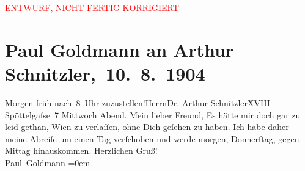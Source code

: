 
\begin{center}
            \textcolor{red}{ENTWURF, NICHT FERTIG KORRIGIERT}
                      \end{center}
            
         
         \renewcommand{\erwaehntePersonen}{Personen: Paul Goldmann}
         \renewcommand{\erwaehnteOrte}{Orte: Edmund-Weiß-Gasse 7, Wien}
         \renewcommand{\erwaehnteWerke}{}
               \section[ Paul Goldmann an Arthur Schnitzler, 10. 8. 1904]{ Paul Goldmann an Arthur Schnitzler, 10. 8. 1904}\nopagebreak{}\rehead{ }\begin{ledgroupsized}[t]{13cm}\normalsize\beginnumbering{} \toendnotes[C]{\smallbreak\pagebreak[2]} 
\toendnotes[C]{\smallbreak}\pstart{}{\pb}Morgen{ }früh nach 8 Uhr zuzustellen!\pend{}\pstart{}Herrn\pend{}\pstart{}Dr. Arthur Schnitzler\pend{}\pstart{}XVIII Spöttelgaſse 7\pend{}{\bigskip}\pstart
           {\pb}Mittwoch{ }Abend.\pend
           \pstart{}Mein lieber Freund,\pend\pstart
           Es hätte mir doch gar zu leid gethan, Wien zu
               verlaſſen, ohne Dich geſehen zu haben. Ich habe daher meine Abreiſe um einen Tag
               verſchoben und werde morgen, Donnerſtag, gegen
                  Mittag{ }\label{K_L03450-1v}\label{K_L03450-1h} hinauskommen.\pend
           \pstart
           Herzlichen Gruß! {\\[\baselineskip]}\spacefill\mbox{Paul Goldmann}\pend
           \leftskip=0em{}
         
         \endnumbering{}\end{ledgroupsized}  \newcommand{\dateiname}{L03450}\newcommand{\titel}{Paul Goldmann an Arthur Schnitzler, 10. 8. 1904}\newcommand{\editorInnen}{Martin Anton Müller und Laura Untner}
      